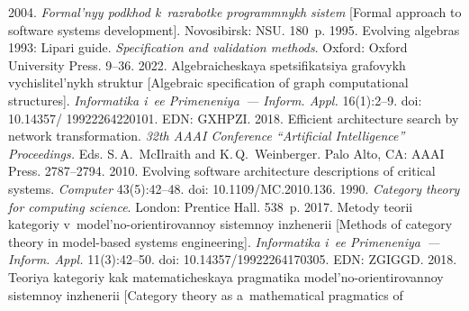    


 

  \begin{multicols}{2}

\renewcommand{\bibname}{\protect\rmfamily References}

{\small\frenchspacing
 {%
 \begin{thebibliography}{99} 
    2004. \textit{Formal'nyy podkhod k~razrabotke programmnykh sistem} 
[Formal approach to software systems development]. Novosibirsk: NSU. 180~p.
 1995. Evolving algebras 1993: Lipari guide. \textit{Specification and 
validation methods}. Oxford: Oxford University Press. 9--36.
    2022. Algebraicheskaya spetsifikatsiya grafovykh vychislitel'nykh 
struktur [Algebraic specification of graph computational structures]. \textit{Informatika i~ee 
Primeneniya~--- Inform. Appl.} 16(1):2--9. doi: 10.14357/ 19922264220101. EDN: GXHPZI.
    2018. Efficient architecture search 
by network transformation. \textit{32th AAAI Conference ``Artificial Intelligence'' Proceedings.} 
Eds. S.\,A.~McIlraith and K.\,Q.~Weinberger. Palo Alto, CA: AAAI Press. 2787--2794. 
    2010. Evolving software architecture descriptions 
of critical systems. \textit{Computer} 43(5):42--48. doi: 10.1109/MC.2010.136.
    1990. \textit{Category theory for computing science}. London: 
Prentice Hall. 538~p.
    2017. Metody teorii kategoriy v~model'no-orientirovannoy sistemnoy 
inzhenerii [Methods of category theory in model-based systems engineering]. \textit{Informatika 
i~ee Primeneniya~--- Inform. Appl.} 11(3):42--50. doi: 10.14357/19922264170305. EDN: ZGIGGD.
    2018. Teoriya kategoriy kak ma\-te\-ma\-ti\-che\-skaya pragmatika  
model'no-orientirovannoy sistemnoy inzhenerii [Category theory as a~mathematical pragmatics of 

\end{thebibliography}}}
\end{multicols}
